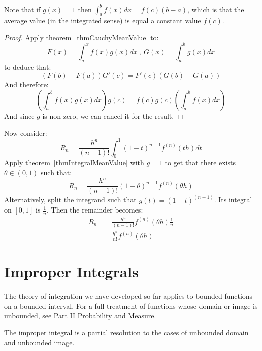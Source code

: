 \documentclass[../Main.tex]{subfiles}
\begin{document}
\begin{remark}
    Note that if $g(x) = 1$ then $\int_a^b f(x) dx = f(c)(b - a)$, which is that the average value (in the integrated sense) is equal a constant value $f(c)$.
\end{remark}
\begin{proof}
    Apply theorem~\ref{thmCauchyMeanValue} to:
    \begin{equation*}
        F(x) = \int_a^x f(x) g(x) dx~,~G(x) = \int_a^b g(x) dx
    \end{equation*}
    to deduce that:
    \begin{equation*}
        (F(b) - F(a))G'(c) = F'(c)(G(b) - G(a))
    \end{equation*}
    And therefore:
    \begin{equation*}
        \left(\int_a^b f(x) g(x) dx\right)g(c) = f(c) g(c) \left(\int_a^b f(x) dx\right)
    \end{equation*}
    And since $g$ is non-zero, we can cancel it for the result.
\end{proof}
Now consider:
\begin{equation*}
    R_n = \frac{h^n}{(n-1)!}\int_0^1 (1 - t)^{n-1} f^{(n)}(th) dt
\end{equation*}
Apply theorem~\ref{thmIntegralMeanValue} with $g = 1$ to get that there exists $\theta \in (0, 1)$ such that:
\begin{equation*}
    R_n = \frac{h^n}{(n-1)!}(1 - \theta)^{n-1} f^{(n)}(\theta h)
\end{equation*}
Alternatively, split the integrand such that $g(t) = (1 - t)^{(n-1)}$. Its integral on $[0, 1]$ is $\frac{1}{n}$.
Then the remainder becomes:
\begin{align*}
    R_n &= \frac{h^n}{(n-1)!}f^{(n)}(\theta h) \frac{1}{n} \\
    &= \frac{h^n}{n!}f^{(n)}(\theta h)
\end{align*}
\section{Improper Integrals}
The theory of integration we have developed so far applies to bounded functions on a bounded interval. For a full treatment of functions whose domain or image is unbounded, see Part II Probability and Measure.

The improper integral is a partial resolution to the cases of unbounded domain and unbounded image.
\end{document}
